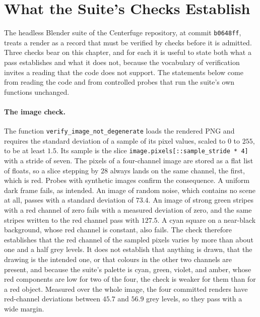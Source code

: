 \section{What the Suite's Checks Establish}

The headless Blender suite of the Centerfuge repository, at commit \texttt{b0648ff}, treats a render as a record that must be verified by checks before it is admitted. Three checks bear on this chapter, and for each it is useful to state both what a pass establishes and what it does not, because the vocabulary of verification invites a reading that the code does not support. The statements below come from reading the code and from controlled probes that run the suite's own functions unchanged.

\paragraph{The image check.} The function \texttt{verify\_image\_not\_degenerate} loads the rendered PNG and requires the standard deviation of a sample of its pixel values, scaled to $0$ to $255$, to be at least $1.5$. Its sample is the slice \texttt{image.pixels[::sample\_stride * 4]} with a stride of seven. The pixels of a four-channel image are stored as a flat list of floats, so a slice stepping by $28$ always lands on the same channel, the first, which is red. Probes with synthetic images confirm the consequence. A uniform dark frame fails, as intended. An image of random noise, which contains no scene at all, passes with a standard deviation of $73.4$. An image of strong green stripes with a red channel of zero fails with a measured deviation of zero, and the same stripes written to the red channel pass with $127.5$. A cyan square on a near-black background, whose red channel is constant, also fails. The check therefore establishes that the red channel of the sampled pixels varies by more than about one and a half grey levels. It does not establish that anything is drawn, that the drawing is the intended one, or that colours in the other two channels are present, and because the suite's palette is cyan, green, violet, and amber, whose red components are low for two of the four, the check is weaker for them than for a red object. Measured over the whole image, the four committed renders have red-channel deviations between $45.7$ and $56.9$ grey levels, so they pass with a wide margin.

